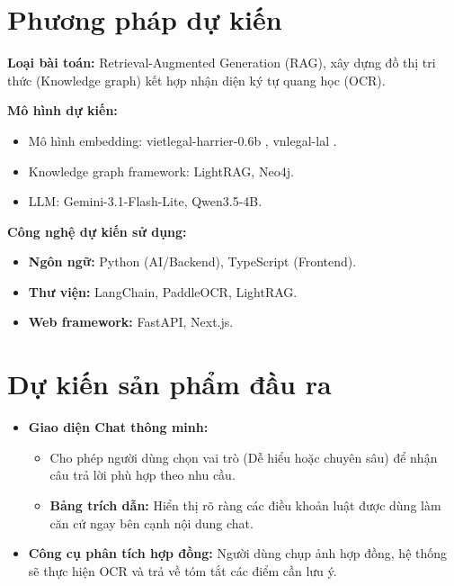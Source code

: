 \section{Phương pháp dự kiến}

\textbf{Loại bài toán:} Retrieval-Augmented Generation (RAG), xây dựng đồ thị tri thức (Knowledge graph) kết hợp nhận diện ký tự quang học (OCR).

\hfill

\textbf{Mô hình dự kiến:} 
\begin{itemize}
    \item Mô hình embedding: vietlegal-harrier-0.6b \cite{vietlegal-harrier}, vnlegal-lal \cite{vnlegal-lal}.
    \item Knowledge graph framework: LightRAG, Neo4j.
    \item LLM: Gemini-3.1-Flash-Lite, Qwen3.5-4B.
\end{itemize}

\hfill

\textbf{Công nghệ dự kiến sử dụng:}
\begin{itemize}
    \item \textbf{Ngôn ngữ:} Python (AI/Backend), TypeScript (Frontend).
    \item \textbf{Thư viện:} LangChain, PaddleOCR, LightRAG.
    \item \textbf{Web framework:} FastAPI, Next.js.
\end{itemize}

\section{Dự kiến sản phẩm đầu ra}

\begin{itemize}
    \item \textbf{Giao diện Chat thông minh:}
    \begin{itemize}
        \item Cho phép người dùng chọn vai trò (Dễ hiểu hoặc chuyên sâu) để nhận câu trả lời phù hợp theo nhu cầu.
        \item \textbf{Bảng trích dẫn:} Hiển thị rõ ràng các điều khoản luật được dùng làm căn cứ ngay bên cạnh nội dung chat.
    \end{itemize}
    \item \textbf{Công cụ phân tích hợp đồng:} Người dùng chụp ảnh hợp đồng, hệ thống sẽ thực hiện OCR và trả về tóm tắt các điểm cần lưu ý.
\end{itemize}